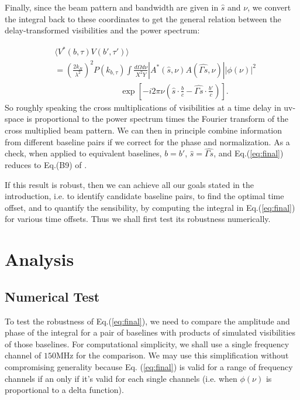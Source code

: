 \documentclass[preprint2,numberedappendix,tighten,twocolappendix]{aastex6}  %
\renewcommand\[{\begin{equation}}
\renewcommand\]{\end{equation}}
\begin{document}
Finally, since the beam pattern and bandwidth are given in $\hat{s}$
and $\nu$, we convert the integral back to these coordinates to get
the general relation between the delay-transformed visibilities and
the power spectrum:

\begin{equation}
\boxed{\begin{aligned} & \langle V^{*}(b,\tau)V(b',\tau')\rangle\\
 & =\left(\frac{2k_{B}}{\lambda^{2}}\right)^{2}P(k_{b,\tau})\int\frac{d\Omega d\nu}{X^{2}Y}|A^{*}(\hat{s},\nu)A(\hat{\Gamma s},\nu)||\phi(\nu)|^{2}\\
 & \qquad \qquad \qquad \qquad \exp\left[-i2\pi\nu\left(\hat{s}\cdot\frac{b}{c}-\hat{\Gamma s}\cdot\frac{b'}{c}\right)\right].\end{aligned}}
\label{eq:final}
\end{equation}
So roughly speaking the cross multiplications of visibilities at a time delay
in uv-space is proportional to the power spectrum times the Fourier
transform of the cross multiplied beam pattern. We can then in principle
combine information from different baseline pairs if we correct for
the phase and normalization. As a check, when applied to equivalent baselines,
$b=b'$, $\hat{s}=\hat{\Gamma s}$, and Eq.(\ref{eq:final}) reduces to Eq.(B9) of \cite{paper32}. 

If this result is robust, then we can achieve all our goals stated in the introduction, i.e. to identify 
candidate baseline pairs, to find the optimal time offset, and to quantify the sensibility, by computing the integral
in Eq.(\ref{eq:final}) for various time offsets. Thus we shall first test its robustness numerically.


\section{Analysis}
\subsection{Numerical Test \label{sec:Techniquet}}

To test the robustness of Eq.(\ref{eq:final}), we need to compare the amplitude and phase of the integral
for a pair of baselines with products of simulated visibilities of those baselines. For computational simplicity, we shall use a single frequency channel of $150$MHz for the comparison. We may use this simplification without compromising generality because Eq. (\ref{eq:final}) is valid for a range of frequency channels if an only if it's valid for each single channels (i.e. when $\phi(\nu)$ is proportional to a delta function). 
\end{document}
